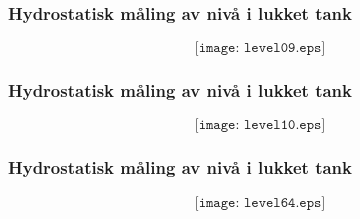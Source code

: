 \documentclass[aspectratio=169,xcolor=dvipsnames]{beamer}
\begin{document}
%
\begin{frame}
	\frametitle{Hydrostatisk måling av nivå i lukket tank}

	$$\texttt{[image: level09.eps]}$$
\end{frame}
%
%
%
%
%
%
\begin{frame}
	\frametitle{Hydrostatisk måling av nivå i lukket tank}

	$$\texttt{[image: level10.eps]}$$
\end{frame}
%
%
%
%
\begin{frame}
	\frametitle{Hydrostatisk måling av nivå i lukket tank}

	$$\texttt{[image: level64.eps]}$$
\end{frame}
%
\end{document}

